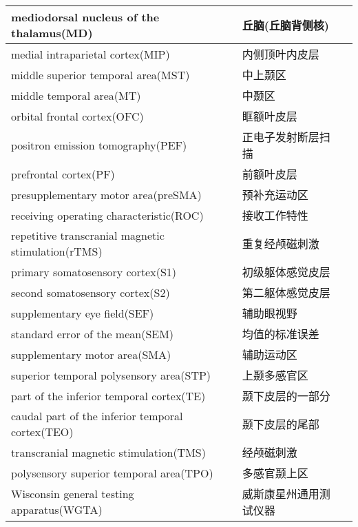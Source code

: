 \begin{table}[htbp]
{\begin{tabular}{llll}
        \midrule
        mediodorsal nucleus of the thalamus(MD)      &&丘脑(丘脑背侧核)   \\
        \midrule
        medial intraparietal cortex(MIP)      &&内侧顶叶内皮层   \\
        \midrule
        middle superior temporal area(MST)     &&中上颞区   \\
        \midrule
        middle temporal area(MT)       &&中颞区   \\
        \midrule
        orbital frontal cortex(OFC)       &&眶额叶皮层   \\
        \midrule
        positron emission tomography(PEF)       &&正电子发射断层扫描   \\
        \midrule
        prefrontal cortex(PF)       &&前额叶皮层   \\
        \midrule
        presupplementary motor area(preSMA)       &&预补充运动区   \\
        \midrule
        receiving operating characteristic(ROC)       &&接收工作特性   \\
        \midrule
        repetitive transcranial magnetic stimulation(rTMS)      &&重复经颅磁刺激   \\
        \midrule
        primary somatosensory cortex(S1)      &&初级躯体感觉皮层   \\
        \midrule
        second somatosensory cortex(S2)      &&第二躯体感觉皮层   \\
        \midrule
        supplementary eye field(SEF)      &&辅助眼视野   \\
        \midrule
        standard error of the mean(SEM)      &&均值的标准误差   \\
        \midrule
        supplementary motor area(SMA)      &&辅助运动区   \\
        \midrule
        superior temporal polysensory area(STP)      &&上颞多感官区   \\
        \midrule
        part of the inferior temporal cortex(TE)     &&颞下皮层的一部分   \\
        \midrule
        caudal part of the inferior temporal cortex(TEO)      &&颞下皮层的尾部   \\
        \midrule
        transcranial magnetic stimulation(TMS)     &&经颅磁刺激   \\
        \midrule
        polysensory superior temporal area(TPO)      &&多感官颞上区   \\
        \midrule
        Wisconsin general testing apparatus(WGTA)      &&威斯康星州通用测试仪器   \\

		\bottomrule  

	\end{tabular}}
    \end{table}%

